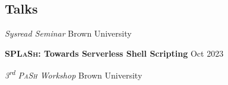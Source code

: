 \documentclass[margin,12pt]{resume}
\newcommand{\descriptionVSpace}{\vspace{0.5ex}\xspace}
\newcommand{\subsectionVSpace}{\vspace{3.5ex}\xspace}
\newcommand{\sectionVSpace}{\vspace{1ex}\xspace} %
\newcommand{\pash}{\textsc{PaSh}\xspace}
\newcommand{\sectionVSpaceCorrection}{\vspace{-3.5ex}} %
\newcommand{\splash}{\textsc{SPLaSh}\xspace}
\newcommand{\header}[1]{\textbf{#1}\xspace}
\newcommand{\competition}[1]{\header{#1}\xspace}
\newcommand{\event}[1]{\textit{#1}\xspace}
\newcommand{\interval}[2]{#1 --- #2\xspace}
\newcommand{\ordinal}[1]{\textsuperscript{#1}\xspace}
\newcommand{\place}[1]{#1\xspace}
\newcommand{\project}[2]{\header{\href{#2}{#1}}}
\newcommand{\singleDate}[1]{#1\xspace}
\newcommand{\talk}[1]{\header{#1}\xspace}
\newenvironment{rSubsection}{}{\par\subsectionVSpace}
\newenvironment{rSection}[1]{\sectionVSpaceCorrection\section{#1}\xspace}{\sectionVSpace\par}
\newenvironment{jobDuties}{\descriptionVSpace}{\par}
\begin{document}
\begin{resume}
\begin{rSection}{Talks}
\begin{rSubsection}
            \event{Sysread Seminar} \hfill \place{Brown University}
        \end{rSubsection}



        \begin{rSubsection}
            \talk{\splash: Towards Serverless Shell Scripting} \hfill \singleDate{Oct 2023}

            \event{3\ordinal{rd} \pash Workshop} \hfill \place{Brown University}
        \end{rSubsection}
    \end{rSection}







\end{resume}
\end{document}
